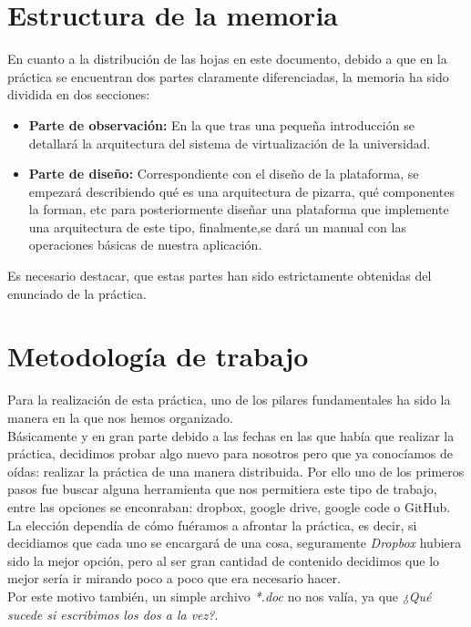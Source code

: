 \section*{Estructura de la memoria}
En cuanto a la distribución de las hojas en este documento, debido a que en la práctica se encuentran dos partes claramente diferenciadas, la memoria ha sido dividida en dos secciones:
\begin{itemize}
\item \textbf{Parte de observación:} En la que tras una pequeña introducción se detallará la arquitectura del sistema de virtualización de la universidad.
\item \textbf{Parte de diseño:} Correspondiente con el diseño de la plataforma, se empezará describiendo qué es una arquitectura de pizarra, qué componentes la forman, etc para posteriormente diseñar una plataforma que implemente una arquitectura de este tipo, finalmente,se dará un manual con las operaciones básicas de nuestra aplicación. 
\end{itemize}

Es necesario destacar, que estas partes han sido estrictamente obtenidas del enunciado de la práctica.

\section*{Metodología de trabajo}

Para la realización de esta práctica, uno de los pilares fundamentales ha sido la manera en la que nos hemos organizado.\\

Básicamente y en gran parte debido a las fechas en las que había que realizar la práctica, decidimos probar algo nuevo para nosotros pero que ya conocíamos de oídas: realizar la práctica de una manera distribuida. Por ello uno de los primeros pasos fue buscar alguna herramienta que nos permitiera este tipo de trabajo, entre las opciones se enconraban: dropbox, google drive, google code o GitHub.\\

La elección dependía de cómo fuéramos a afrontar la práctica, es decir, si decidiamos que cada uno se encargará de una cosa, seguramente \emph{Dropbox} hubiera sido la mejor opción, pero al ser gran cantidad de contenido decidimos que lo mejor sería ir mirando poco a poco que era necesario hacer.\\

Por este motivo también, un simple archivo \emph{*.doc} no nos valía, ya que \emph{¿Qué sucede si escribimos los dos a la vez?}.\\

